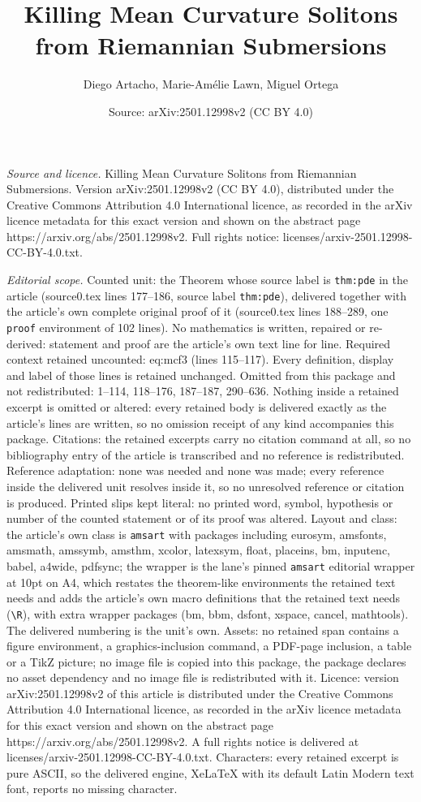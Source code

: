 \documentclass[10pt,a4paper]{amsart}
\title[Killing Mean Curvature Solitons from Riemannian Submersions]{Killing Mean Curvature Solitons from Riemannian Submersions}
\author{Diego Artacho, Marie-Am\'elie Lawn, Miguel Ortega}
\date{Source: arXiv:2501.12998v2 (CC BY 4.0)}
\begin{document}
\maketitle

\noindent\emph{Source and licence.} Killing Mean Curvature Solitons from Riemannian Submersions. Version arXiv:2501.12998v2 (CC BY 4.0), distributed under the Creative Commons Attribution 4.0 International licence, as recorded in the arXiv licence metadata for this exact version and shown on the abstract page https://arxiv.org/abs/2501.12998v2. Full rights notice: licenses/arxiv-2501.12998-CC-BY-4.0.txt.\par\smallskip

\noindent\textit{Editorial scope.} Counted unit: the Theorem whose source label is \texttt{thm:pde} in the article (source0.tex lines 177--186, source label \texttt{thm:pde}), delivered together with the article's own complete original proof of it (source0.tex lines 188--289, one \texttt{proof} environment of 102 lines). No mathematics is written, repaired or re-derived: statement and proof are the article's own text line for line. Required context retained uncounted: eq:mcf3 (lines 115--117). Every definition, display and label of those lines is retained unchanged. Omitted from this package and not redistributed: 1--114, 118--176, 187--187, 290--636. Nothing inside a retained excerpt is omitted or altered: every retained body is delivered exactly as the article's lines are written, so no omission receipt of any kind accompanies this package. Citations: the retained excerpts carry no citation command at all, so no bibliography entry of the article is transcribed and no reference is redistributed. Reference adaptation: none was needed and none was made; every reference inside the delivered unit resolves inside it, so no unresolved reference or citation is produced. Printed slips kept literal: no printed word, symbol, hypothesis or number of the counted statement or of its proof was altered. Layout and class: the article's own class is \texttt{amsart} with packages including eurosym, amsfonts, amsmath, amssymb, amsthm, xcolor, latexsym, float, placeins, bm, inputenc, babel, a4wide, pdfsync; the wrapper is the lane's pinned \texttt{amsart} editorial wrapper at 10pt on A4, which restates the theorem-like environments the retained text needs and adds the article's own macro definitions that the retained text needs (\texttt{\textbackslash R}), with extra wrapper packages (bm, bbm, dsfont, xspace, cancel, mathtools). The delivered numbering is the unit's own. Assets: no retained span contains a figure environment, a graphics-inclusion command, a PDF-page inclusion, a table or a TikZ picture; no image file is copied into this package, the package declares no asset dependency and no image file is redistributed with it. Licence: version arXiv:2501.12998v2 of this article is distributed under the Creative Commons Attribution 4.0 International licence, as recorded in the arXiv licence metadata for this exact version and shown on the abstract page https://arxiv.org/abs/2501.12998v2. A full rights notice is delivered at licenses/arxiv-2501.12998-CC-BY-4.0.txt. Characters: every retained excerpt is pure ASCII, so the delivered engine, XeLaTeX with its default Latin Modern text font, reports no missing character.
\end{document}
